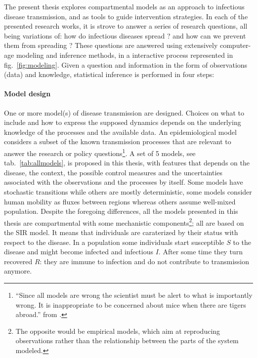 The present thesis explores compartmental models as an approach to infectious disease transmission, and as tools to guide intervention strategies. In each of the presented research works, it is strove to answer a series of research questions, all being variations of: how do infectious diseases spread ? and how can we prevent them from spreading ? These questions are answered using extensively computer-age modeling and inference methods, in a interactive process represented in fig.~\ref{fig:modeling}. Given a question and information in the form of observations (data) and knowledge, statistical inference is performed in four steps:

\paragraph{Model design} One or more model(s) of disease transmission are designed. Choices on what to include and how to express the supposed dynamics depends on the underlying knowledge of the processes and the available data. An epidemiological model considers a subset of the known transmission processes that are relevant to answer the research or policy questions\footnote[][]{“Since all models are wrong the scientist must be alert to what is importantly wrong. It is inappropriate to be concerned about mice when there are tigers abroad.” from .}. A set of 5 models, see tab.~\ref{tab:allmodels}, is proposed in this thesis, with features that depends on the disease, the context, the possible control measures and the uncertainties associated with the observations and the processes by itself. Some models have stochastic transitions while others are mostly deterministic, some models consider human mobility as fluxes between regions whereas others assume well-mixed population. Despite the foregoing differences, all the models presented in this thesis are compartmental with some mechanistic components\footnote{The opposite would be empirical models, which aim at reproducing observations rather than the relationship between the parts of the system modeled.}; all are based on the SIR model. It means that individuals are caraterized by their status with respect to the disease. In a population some individuals start susceptible $S$ to the disease and might become infected and infectious $I$. After some time they turn recovered $R$: they are immune to infection and do not contribute to transmission anymore. %
